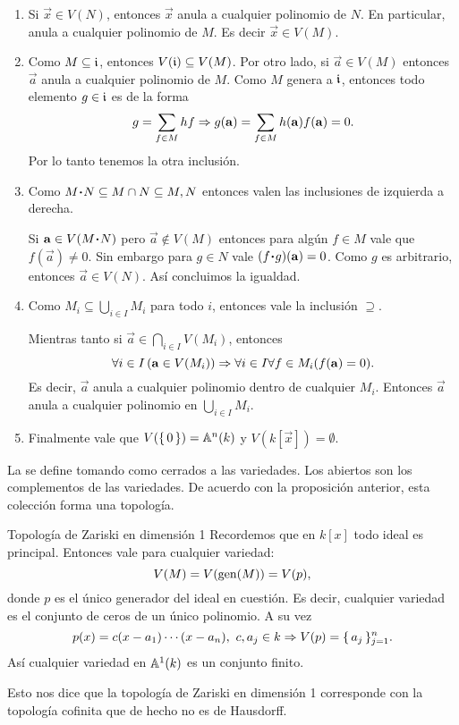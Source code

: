 \documentclass[12pt]{memoir}
\begin{document}
\begin{ptcbp}
\begin{enumerate}
  \item Si $\vec x\in V(N)$, entonces $\vec{x}$ anula a cualquier polinomio de $N$. En particular, anula a cualquier polinomio de $M$. Es decir $\vec{x}\in V(M)$.
  \item Como $M\subseteq\mathfrak{i}$, entonces $V(\mathfrak{i})\subseteq V(M)$. Por otro lado, si $\vec{a}\in V(M)$ entonces $\vec{a}$ anula a cualquier polinomio de $M$. Como $M$ genera a $\mathfrak{i}$, entonces todo elemento $g\in\mathfrak{i}$ es de la forma
  $$g=\sum_{f\in M} hf\Rightarrow g(\mathbf{a})=\sum_{f\in M}h(\mathbf{a})f(\mathbf{a})=0.$$
  Por lo tanto tenemos la otra inclusión.
  \item Como $M\.N\subseteq M\cap N\subseteq M,N$ entonces valen las inclusiones de izquierda a derecha.\par 
  Si $\vec a\in V(M\.N)$ pero $\vec a\not\in V(M)$ entonces para algún $f\in M$ vale que $f(\vec{a})\neq 0$. Sin embargo para $g\in N$ vale $(f\.g)(\vec{a})=0$. Como $g$ es arbitrario, entonces $\vec a\in V(N)$. Así concluimos la igualdad.
  \item Como $M_i\subseteq\bigcup_{i\in I}M_i$ para todo $i$, entonces vale la inclusión $\supseteq$.\par 
  Mientras tanto si $\vec{a}\in\bigcap_{i\in I}V(M_i)$, entonces
  $$\forall i\in I\left(\mathbf{a}\in V(M_i)\right)\Rightarrow\forall i\in I\forall f\in M_i(f(\mathbf{a})=0).$$
  Es decir, $\vec{a}$ anula a cualquier polinomio dentro de cualquier $M_i$. Entonces $\vec{a}$ anula a cualquier polinomio en $\bigcup_{i\in I}M_i$. 
  \item Finalmente vale que $V(\{\,0\,\})=\mathbb{A}^n(k)$ y $V(k[\vec{x}])=\emptyset$.
\end{enumerate}
\end{ptcbp}

\begin{Def}\label{def:top-zariski}
  La  se define tomando como cerrados a las variedades. Los abiertos son los complementos de las variedades. De acuerdo con la proposición anterior, esta colección forma una topología.
\end{Def}

\begin{Ex}{Topología de Zariski en dimensión 1}
Recordemos que en $k[x]$ todo ideal es principal. Entonces vale para cualquier variedad:
$$V(M)=V(\operatorname{gen}(M))=V(p),$$
donde $p$ es el único generador del ideal en cuestión. Es decir, cualquier variedad es el conjunto de ceros de un único polinomio. A su vez
$$p(x)=c(x-a_1)\cdots(x-a_n),\ c,a_j\in k\Rightarrow V(p)=\{\,a_j\,\}_{j=1}^n.$$
Así cualquier variedad en $\mathbb{A}^1(k)$ es un conjunto finito.\par 
Esto nos dice que la topología de Zariski en dimensión 1 corresponde con la topología cofinita que de hecho no es de Hausdorff.
\end{Ex}
\end{document}

